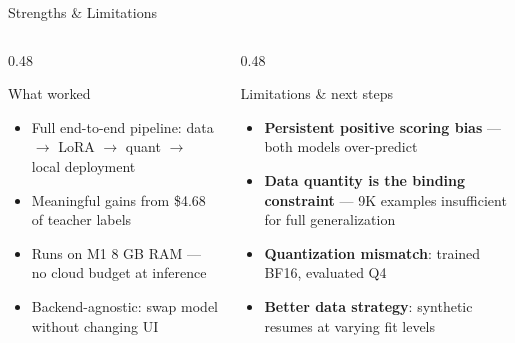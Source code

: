 \documentclass[aspectratio=169,11pt]{beamer}
\begin{document}
\begin{frame}{Strengths \& Limitations}
\begin{columns}[T]
\begin{column}{0.48\textwidth}
  \begin{block}{What worked}
    \small
    \begin{itemize}
      \setlength\itemsep{0.2em}
      \item Full end-to-end pipeline: data $\to$ LoRA $\to$ quant $\to$ local deployment
      \item Meaningful gains from \$4.68 of teacher labels
      \item Runs on M1 8 GB RAM --- no cloud budget at inference
      \item Backend-agnostic: swap model without changing UI
    \end{itemize}
  \end{block}
\end{column}
\begin{column}{0.48\textwidth}
  \begin{alertblock}{Limitations \& next steps}
    \small
    \begin{itemize}
      \setlength\itemsep{0.2em}
      \item \textbf{Persistent positive scoring bias} --- both models over-predict
      \item \textbf{Data quantity is the binding constraint} --- 9K examples insufficient for full generalization
      \item \textbf{Quantization mismatch}: trained BF16, evaluated Q4
      \item \textbf{Better data strategy}: synthetic resumes at varying fit levels
    \end{itemize}
  \end{alertblock}
\end{column}
\end{columns}
\end{frame}
\end{document}
